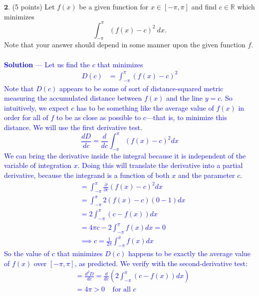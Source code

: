 \documentclass[12pt]{article}
\begin{document}
\vspace{0.3in}

\noindent $\textbf{2}$. (5 points) Let $f(x)$ be a given function for $x \in [-\pi, \pi]$ and find $c \in \mathbb{R}$ which minimizes
$$\int_{-\pi}^\pi \left ( f(x) - c \right )^2 \ dx.$$
Note that your answer should depend in some manner upon the given function $f$.\\ \\
\textcolor{blue}{\textbf{Solution} — Let us find the $c$ that minimizes 
\begin{align*}
D(c) &= \int_{-\pi}^{\pi} (f(x) - c)^2
\end{align*}
Note that $D(c)$ appears to be some of sort of distance-squared metric measuring the accumulated distance between $f(x)$ and the line $y=c$. So intuitively, we expect $c$ has to be something like the average value of $f(x)$ in order for all of $f$ to be as close as possible to $c$—that is, to minimize this distance. We will use the first derivative test.  $$\frac{dD}{dc} = \frac{d}{dc} \int_{-\pi}^{\pi} (f(x) - c)^2 dx$$ We can bring the derivative inside the integral because it is independent of the variable of integration $x$. Doing this will translate the derivative into a partial derivative, because the integrand is a function of both $x$ and the parameter $c$.
\begin{align*}
&=  \int_{-\pi}^{\pi} \frac{\partial}{\partial c} (f(x) - c)^2 dx \\
&=   \int_{-\pi}^{\pi} 2 (f(x) - c)(0 - 1) dx \\
&=   2 \int_{-\pi}^{\pi} (c - f(x)) dx \\
&=   4\pi c - 2 \int_{-\pi}^{\pi} f(x) dx = 0 \\
&\implies \boxed{c = \frac{1}{2\pi} \int_{-\pi}^{\pi} f(x) dx} 
\end{align*}
So the value of $c$ that minimizes $D(c)$ happens to be exactly the average value of $f(x)$ over $[-\pi, \pi]$, as predicted. We verify with the second-derivative test:
\begin{align*}
&=  \frac{d^2 D}{dc} = \frac{d}{dc} \left( 2 \int_{-\pi}^{\pi} (c - f(x)) dx \right) \\
&= 4\pi > 0 \;\;\;\; \text{for all $c$}
\end{align*}
}


\vspace{0.3in}
\end{document}
